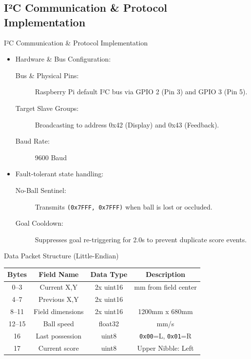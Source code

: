 \subsection{I²C Communication \& Protocol Implementation}\label{subsection:i2c_protocol}
\begin{frame}{I²C Communication \& Protocol Implementation}
    \begin{itemize}
        \item Hardware \& Bus Configuration:
        \begin{description}
            \item[Bus \& Physical Pins:] Raspberry Pi default I²C bus via GPIO 2 (Pin 3) and GPIO 3 (Pin 5).
            \item[Target Slave Groups:] Broadcasting to address 0x42 (Display) and 0x43 (Feedback).
            \item[Baud Rate:] 9600 Baud
        \end{description}
        \item Fault-tolerant state handling:
        \begin{description}
            \item[No-Ball Sentinel:] Transmits \texttt{(0x7FFF, 0x7FFF)} when ball is lost or occluded.
            \item[Goal Cooldown:] Suppresses goal re-triggering for 2.0s to prevent duplicate score events.
        \end{description}
    \end{itemize}
\end{frame}

\begin{frame}{Data Packet Structure (Little-Endian)}
    \begin{center}
        \begin{tabular}{|c|c|c|c|}\hline
            Bytes   & Field Name        & Data Type & Description \\\hline\hline
            0--3    & Current X,Y       & 2x uint16 & mm from field center \\\hline
            4--7    & Previous X,Y      & 2x uint16 & \\\hline
            8--11   & Field dimensions  & 2x uint16 & 1200mm x 680mm \\\hline
            12--15  & Ball speed        & float32   & mm/s\\\hline
            16      & Last possession   & uint8     & \texttt{0x00}=L, \texttt{0x01}=R\\\hline
            17      & Current score     & uint8     & Upper Nibble: Left \\\hline
        \end{tabular}
    \end{center}
\end{frame}

